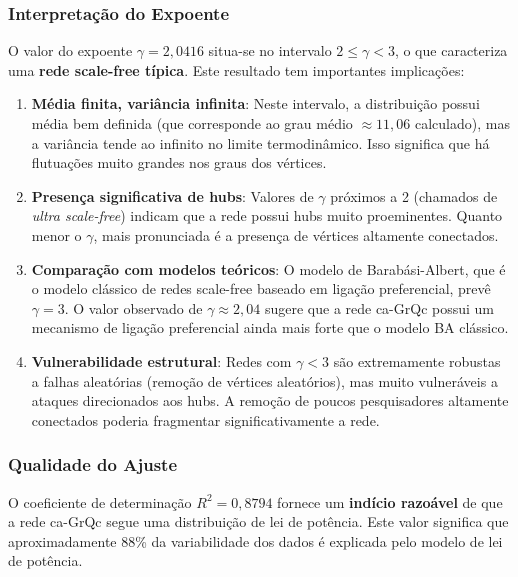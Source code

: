 \documentclass[12pt,a4paper]{article}
\begin{document}
\subsubsection{Interpretação do Expoente}

O valor do expoente $\gamma = 2,0416$ situa-se no intervalo $2 \leq \gamma < 3$, o que caracteriza uma \textbf{rede scale-free típica}. Este resultado tem importantes implicações:

\begin{enumerate}
    \item \textbf{Média finita, variância infinita}: Neste intervalo, a distribuição possui média bem definida (que corresponde ao grau médio $\approx 11,06$ calculado), mas a variância tende ao infinito no limite termodinâmico. Isso significa que há flutuações muito grandes nos graus dos vértices.
    
    \item \textbf{Presença significativa de hubs}: Valores de $\gamma$ próximos a 2 (chamados de \textit{ultra scale-free}) indicam que a rede possui hubs muito proeminentes. Quanto menor o $\gamma$, mais pronunciada é a presença de vértices altamente conectados.
    
    \item \textbf{Comparação com modelos teóricos}: O modelo de Barabási-Albert, que é o modelo clássico de redes scale-free baseado em ligação preferencial, prevê $\gamma = 3$. O valor observado de $\gamma \approx 2,04$ sugere que a rede ca-GrQc possui um mecanismo de ligação preferencial ainda mais forte que o modelo BA clássico.
    
    \item \textbf{Vulnerabilidade estrutural}: Redes com $\gamma < 3$ são extremamente robustas a falhas aleatórias (remoção de vértices aleatórios), mas muito vulneráveis a ataques direcionados aos hubs. A remoção de poucos pesquisadores altamente conectados poderia fragmentar significativamente a rede.
\end{enumerate}

\subsubsection{Qualidade do Ajuste}

O coeficiente de determinação $R^2 = 0,8794$ fornece um \textbf{indício razoável} de que a rede ca-GrQc segue uma distribuição de lei de potência. Este valor significa que aproximadamente 88\% da variabilidade dos dados é explicada pelo modelo de lei de potência.
\end{document}
